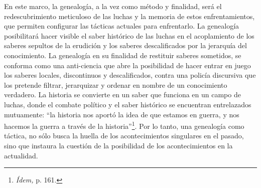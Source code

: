 En este marco, la genealogía, a la vez como método y finalidad, será el redescubrimiento meticuloso de las luchas y la memoria de estos enfrentamientos, que permiten configurar las tácticas actuales para enfrentarlo. La genealogía posibilitará hacer visible el saber histórico de las luchas en el acoplamiento de los saberes sepultos de la erudi­ción y los saberes descalificados por la jerarquía del cono­cimiento. La genealogía en su finalidad de restituir saberes sometidos, se conforma como una anti-ciencia que abre la posibilidad de hacer entrar en juego los saberes locales, discontinuos y descalificados, contra una policía discursiva que los pretende filtrar, jerarquizar y ordenar en nombre de un conocimiento verdadero. La historia se convierte en un saber que funciona en un campo de luchas, donde el combate político y el saber histórico se encuentran entrelazados mutuamente: \enquote{la historia nos aportó la idea de que estamos en guerra, y nos hacemos la guerra a través de la historia}\footnote{\emph{Ídem,} p. 161.}. Por lo tanto, una genealogía como táctica, no sólo busca la huella de los acontecimientos singulares en el pasado, sino que instaura la cuestión de la posibilidad de los acontecimientos en la actualidad.

